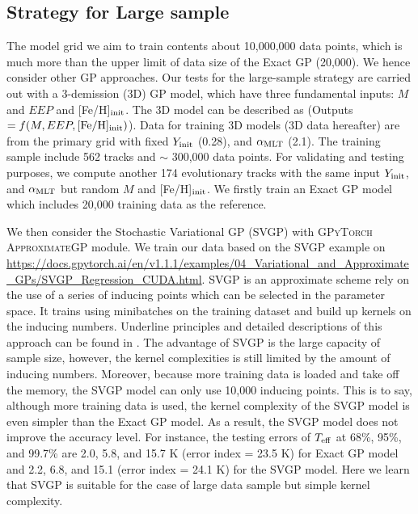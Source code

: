  \subsection{Strategy for Large sample}

The model grid we aim to train contents about 10,000,000 data points, which is much more than the upper limit of data size of the Exact GP (20,000). We hence consider other GP approaches. Our tests for the large-sample strategy are carried out with a 3-demission (3D) GP model, which have three fundamental inputs: $M$ and $EEP$ and  [Fe/H]$_{\rm init}$. The 3D model can be described as  (Outputs $ = f(M, EEP, {\rm [Fe/H]_{init}})$). 
Data for training 3D models (3D data hereafter) are from the primary grid with fixed $Y_{\rm init}$ (0.28), and $\alpha_{\rm MLT}$ (2.1). The training sample include 562 tracks and $\sim$ 300,000 data points. For validating and testing purposes, we compute another 174 evolutionary tracks with the same input $Y_{\rm init}$, and $\alpha_{\rm MLT}$ but random $M$ and [Fe/H]$_{\rm init}$. We firstly train an Exact GP model which includes 20,000 training data as the reference. 


We then consider the Stochastic Variational GP (SVGP) with \textsc{GPyTorch ApproximateGP} module. We train our data based on the SVGP example on \url{https://docs.gpytorch.ai/en/v1.1.1/examples/04_Variational_and_Approximate_GPs/SVGP_Regression_CUDA.html}. 
SVGP is an approximate scheme rely on the use of a series of inducing points which can be selected in the parameter space. It trains using minibatches on the training dataset and build up kernels on the inducing numbers. Underline principles and detailed descriptions of this approach can be found in \citet{hensman2015scalable}. The advantage of SVGP is the large capacity of sample size, however, the kernel complexities is still limited by the amount of inducing numbers. Moreover, because more training data is loaded and take off the memory, the SVGP model can only use 10,000 inducing points. This is to say, although more training data is used, the kernel complexity of the SVGP model is even simpler than the Exact GP model. As a result, the SVGP model does not improve the accuracy level.  For instance, the testing errors of $T_{\rm eff}$ at 68\%, 95\%, and 99.7\% are 2.0, 5.8, and 15.7 K (error index = 23.5 K) for Exact GP model and 2.2, 6.8, and 15.1 (error index = 24.1 K) for the SVGP model. Here we learn that SVGP is suitable for the case of large data sample but simple kernel complexity. 

